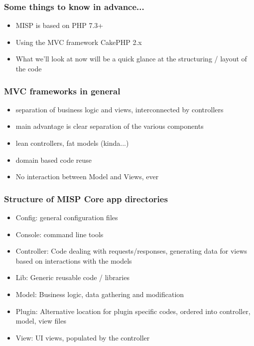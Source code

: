 
\begin{frame}
\titlepage
\end{frame}

\begin{frame}
  \frametitle{Some things to know in advance...}
  \begin{itemize}
    \item MISP is based on PHP 7.3+
    \item Using the MVC framework CakePHP 2.x
    \item What we'll look at now will be a quick glance at the structuring / layout of the code
  \end{itemize}
\end{frame}

\begin{frame}
  \frametitle{MVC frameworks in general}
  \begin{itemize}
    \item separation of business logic and views, interconnected by controllers
    \item main advantage is clear separation of the various components
    \item lean controllers, fat models (kinda...)
    \item domain based code reuse
    \item No interaction between Model and Views, ever
  \end{itemize}
\end{frame}

\begin{frame}
  \frametitle{Structure of MISP Core app directories}
  \begin{itemize}
    \item Config: general configuration files
    \item Console: command line tools
    \item Controller: Code dealing with requests/responses, generating data for views based on interactions with the models
    \item Lib: Generic reusable code / libraries
    \item Model: Business logic, data gathering and modification
    \item Plugin: Alternative location for plugin specific codes, ordered into controller, model, view files
    \item View: UI views, populated by the controller
  \end{itemize}
\end{frame}

